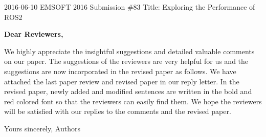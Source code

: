 \documentclass{article}
\begin{document}
\begin{flushleft}
  2016-06-10\newline
  EMSOFT 2016 Submission \#83\newline
  Title: Exploring the Performance of ROS2\newline
\end{flushleft}
\textbf{Dear Reviewers,}\newline

We highly appreciate the insightful suggestions and detailed valuable comments on our paper. The suggestions of the reviewers are very helpful for us and the suggestions are now incorporated in the revised paper as follows. We have attached the last paper review and revised paper in our reply letter. In the revised paper, newly added and modified sentences are written in the bold and red colored font so that the reviewers can easily find them. We hope the reviewers will be satisfied with our replies to the comments and the revised paper.\newline\newline

\begin{flushleft}
  Yours sincerely,\newline
  Authors
\end{flushleft}

\clearpage




\end{document}

